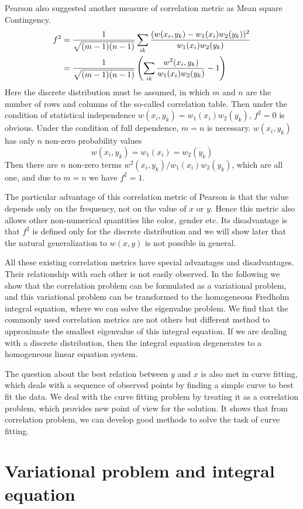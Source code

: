 \documentclass{article}
\begin{document}
Pearson also suggested another measure of correlation metric as \textsf{Mean square Contingency}.
\begin{align}
   f^2 &= \frac{1}{\sqrt{(m-1)(n-1)}}\sum_{ik}
   \frac{(w(x_i,y_k)-w_1(x_i)w_2(y_k))^2}{w_1(x_i)w_2(y_k)} \notag \\
   &=\frac{1}{\sqrt{(m-1)(n-1)}}\left(\sum_{ik}
   \frac{w^2(x_i,y_k)}{w_1(x_i)w_2(y_k)} -1\right)
\end{align}
Here the discrete distribution must be assumed, in
which $m$ and $n$ are the number of rows and columns of the so-called correlation table. Then
under the condition of statistical independence $w(x_i,y_k) = w_1(x_i)w_2(y_k)$, $f^2=0$ is obvious.
Under the condition of full dependence, $m=n$ is necessary. $w(x_i,y_k)$ has only $n$ non-zero
probability values
$$
w(x_i, y_k) = w_1(x_i) = w_2(y_k)
$$
Then there are $n$ non-zero terms $w^2(x_i, y_k)/w_1(x_i)w_2(y_k)$, which are all one, and due
to $m=n$ we have $f^2=1$.

The particular advantage of this correlation metric
of Pearson is that the value depends only on the
frequency, not on the value of $x$ or $y$.
Hence this metric also allows other non-numerical
quantities like color, gender etc. Its disadvantage is
that $f^2$ is defined only for the discrete distribution and we will show later that the natural generalization to $w(x,y)$ is not possible in general.

All these existing correlation metrics have special
advantages and disadvantages. Their relationship with
each other is not easily observed. In the following
we show that the correlation problem can be formulated
as a variational problem, and this variational problem
can be transformed to the homogeneous Fredholm integral equation, where we can solve the eigenvalue problem.
We find that the commonly used correlation metrics are not others but different method to approximate the smallest eigenvalue of this integral equation.
If we are dealing with a discrete distribution, then the integral equation degenerates to a homogeneous linear equation system.

The question about the best relation between $y$ and
$x$ is also met in curve fitting, which deals with
a sequence of observed points by finding a simple curve
to best fit the data. We deal with the curve fitting problem by treating it as a correlation problem, which provides new point of view for the solution. It shows that from correlation problem, we can develop good methods to solve the task of curve fitting.
\section{Variational problem and integral equation}
\end{document}

